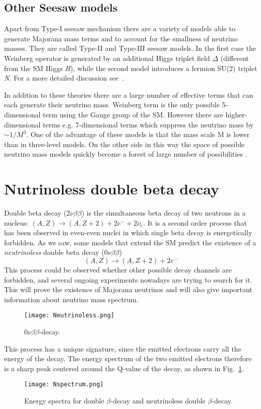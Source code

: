 \documentclass{subnucbo}
\begin{document}
\subsection{Other Seesaw models}
Apart from Type-I seesaw mechanism there are a variety of models able to generate Majorana mass terms and to account for the smallness of neutrino masses.
They are called Type-II and Type-III seesaw models.
In the first case the Weinberg operator is generated by an additional Higgs triplet field $\Delta$ (different from the SM Higgs \emph{H}), while the second model introduces a fermion SU(2) triplet \emph{N}. For a more detailed discussion see~\cite{ref:put}.

In addition to these theories there are a large number of effective terms that can each generate their neutrino mass. Weinberg term is the only possible 5-dimensional term using the Gauge group of the SM. However there are higher-dimensional terms e.g. 7-dimensional terms which suppress the neutrino mass by $\sim1/M^3$.
One of the advantage of these models is that the mass scale M is lower than in three-level models. On the other side in this way the space of possible neutrino mass models quickly become a forest of large number of possibilities .

\section{Nutrinoless double beta decay}
Double beta decay ($2\nu\beta\beta$) is the simultaneous beta decay of two neutrons in a nucleus: $(A, Z)\rightarrow(A, Z+2)+2e^-+2\bar{\nu}_e$.
It is a second order process that has been observed in even-even nuclei in which single beta decay is energetically forbidden. As we saw, some models that extend the SM predict the existence of a \emph{neutrinoless} double beta decay ($0\nu\beta\beta$)
\begin{equation}
(A, Z)\rightarrow(A, Z+2)+2e^-
\end{equation}
This process could be observed whether other possible decay channels are forbidden, and several ongoing experiments nowadays are trying to search for it. This will prove the existence of Majorana neutrinos and will also give important information about neutrino mass spectrum.
\begin{wrapfigure}{l}
{0.35\textwidth}
\texttt{[image: Neutrinoless.png]}
\caption{$0\nu\beta\beta$-decay.}
\vspace{-10pt}
\end{wrapfigure}
This process has a unique signature, since the emitted electrons carry all the energy of the decay. The energy spectrum of the two emitted electrons therefore is a sharp peak centered around the Q-value of the decay, as shown in Fig.~\ref{fig:Nspectrum}.
\begin{figure}
\centering
\texttt{[image: Nspectrum.png]}
\caption{Energy spectra for double $\beta$-decay and neutrinoless double $\beta$-decay.}
\label{fig:Nspectrum}
\end{figure}
\end{document}
